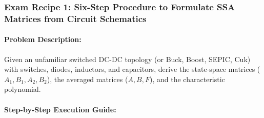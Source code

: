 \subsubsection{Exam Recipe 1: Six-Step Procedure to Formulate SSA Matrices from Circuit Schematics}
\paragraph{Problem Description:}
Given an unfamiliar switched DC-DC topology (or Buck, Boost, SEPIC, Cuk) with switches, diodes, inductors, and capacitors, derive the state-space matrices ($A_1, B_1, A_2, B_2$), the averaged matrices ($A, B, F$), and the characteristic polynomial.

\paragraph{Step-by-Step Execution Guide:}
